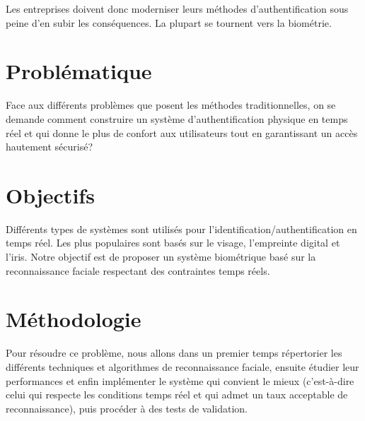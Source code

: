 Les entreprises doivent donc moderniser leurs méthodes d'authentification sous peine d'en subir les conséquences. La plupart se tournent vers la biométrie. 
\section{Problématique}

Face aux différents problèmes que posent les méthodes traditionnelles, on se demande comment construire un système d'authentification physique en temps réel et qui donne le plus de confort aux utilisateurs tout en garantissant un accès hautement sécurisé? 

\section{Objectifs}
Différents types de systèmes sont utilisés pour l'identification/authentification en temps réel. Les  plus  populaires  sont  basés  sur  le  visage, l'empreinte digital et l'iris. Notre objectif est de proposer un système biométrique basé sur la reconnaissance faciale respectant des contraintes  temps  réels.

\section{Méthodologie}
Pour résoudre ce problème, nous allons dans un premier temps répertorier les différents techniques et algorithmes de reconnaissance faciale, ensuite étudier leur performances et enfin implémenter le système qui convient le mieux (c'est-à-dire celui qui respecte les conditions temps réel et qui admet un taux acceptable de reconnaissance), puis procéder à des tests de validation. 
 